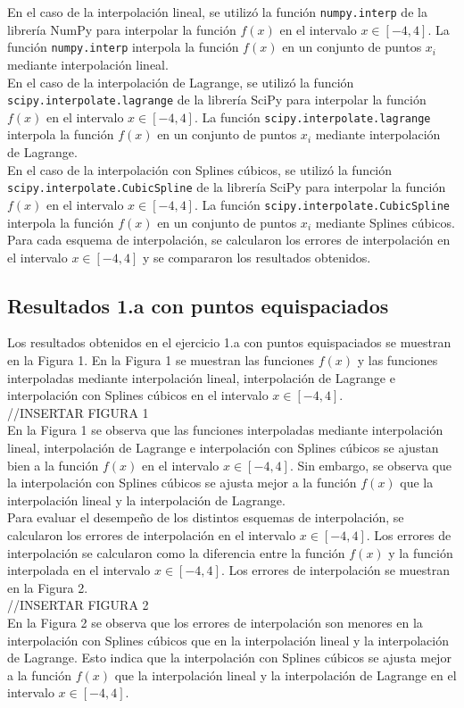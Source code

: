 En el caso de la interpolación lineal, se utilizó la función \texttt{numpy.interp} de la librería NumPy para interpolar la función $f(x)$ en el intervalo $x \in [-4, 4]$. La función \texttt{numpy.interp} interpola la función $f(x)$ en un conjunto de puntos $x_i$ mediante interpolación lineal.\\
En el caso de la interpolación de Lagrange, se utilizó la función \texttt{scipy.interpolate.lagrange} de la librería SciPy para interpolar la función $f(x)$ en el intervalo $x \in [-4, 4]$. La función \texttt{scipy.interpolate.lagrange} interpola la función $f(x)$ en un conjunto de puntos $x_i$ mediante interpolación de Lagrange.\\
En el caso de la interpolación con Splines cúbicos, se utilizó la función \texttt{scipy.interpolate.CubicSpline} de la librería SciPy para interpolar la función $f(x)$ en el intervalo $x \in [-4, 4]$. La función \texttt{scipy.interpolate.CubicSpline} interpola la función $f(x)$ en un conjunto de puntos $x_i$ mediante Splines cúbicos.\\
Para cada esquema de interpolación, se calcularon los errores de interpolación en el intervalo $x \in [-4, 4]$ y se compararon los resultados obtenidos.\\

\subsection{Resultados 1.a con puntos equispaciados}
Los resultados obtenidos en el ejercicio 1.a con puntos equispaciados se muestran en la Figura 1. En la Figura 1 se muestran las funciones $f(x)$ y las funciones interpoladas mediante interpolación lineal, interpolación de Lagrange e interpolación con Splines cúbicos en el intervalo $x \in [-4, 4]$.\\
//INSERTAR FIGURA 1\\
En la Figura 1 se observa que las funciones interpoladas mediante interpolación lineal, interpolación de Lagrange e interpolación con Splines cúbicos se ajustan bien a la función $f(x)$ en el intervalo $x \in [-4, 4]$. Sin embargo, se observa que la interpolación con Splines cúbicos se ajusta mejor a la función $f(x)$ que la interpolación lineal y la interpolación de Lagrange.\\
Para evaluar el desempeño de los distintos esquemas de interpolación, se calcularon los errores de interpolación en el intervalo $x \in [-4, 4]$. Los errores de interpolación se calcularon como la diferencia entre la función $f(x)$ y la función interpolada en el intervalo $x \in [-4, 4]$. Los errores de interpolación se muestran en la Figura 2.\\
//INSERTAR FIGURA 2\\
En la Figura 2 se observa que los errores de interpolación son menores en la interpolación con Splines cúbicos que en la interpolación lineal y la interpolación de Lagrange. Esto indica que la interpolación con Splines cúbicos se ajusta mejor a la función $f(x)$ que la interpolación lineal y la interpolación de Lagrange en el intervalo $x \in [-4, 4]$.\\

